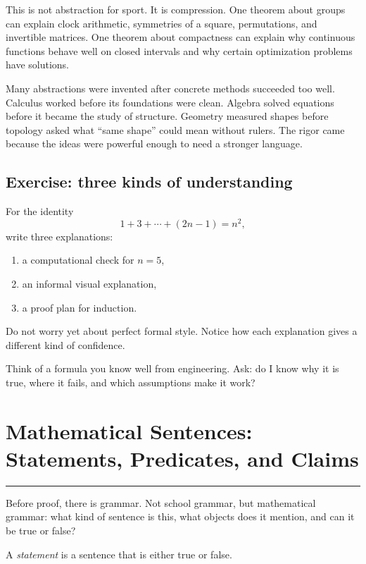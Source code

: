\documentclass[12pt]{article}
\newcommand{\chapterline}{\vspace{0.4em}\hrule\vspace{0.8em}}
\begin{document}
This is not abstraction for sport. It is compression. One theorem about groups can explain clock arithmetic, symmetries of a square, permutations, and invertible matrices. One theorem about compactness can explain why continuous functions behave well on closed intervals and why certain optimization problems have solutions.

\begin{historybox}
Many abstractions were invented after concrete methods succeeded too well. Calculus worked before its foundations were clean. Algebra solved equations before it became the study of structure. Geometry measured shapes before topology asked what ``same shape'' could mean without rulers. The rigor came because the ideas were powerful enough to need a stronger language.
\end{historybox}

\subsection{Exercise: three kinds of understanding}

For the identity
\[
1+3+\cdots+(2n-1)=n^2,
\]
write three explanations:

\begin{enumerate}
\item a computational check for $n=5$,
\item an informal visual explanation,
\item a proof plan for induction.
\end{enumerate}

Do not worry yet about perfect formal style. Notice how each explanation gives a different kind of confidence.

\begin{walkbox}
Think of a formula you know well from engineering. Ask: do I know why it is true, where it fails, and which assumptions make it work?
\end{walkbox}

\newpage
\section{Mathematical Sentences: Statements, Predicates, and Claims}
\chapterline

Before proof, there is grammar. Not school grammar, but mathematical grammar: what kind of sentence is this, what objects does it mention, and can it be true or false?

\begin{definition}
A \emph{statement} is a sentence that is either true or false.
\end{definition}
\end{document}
